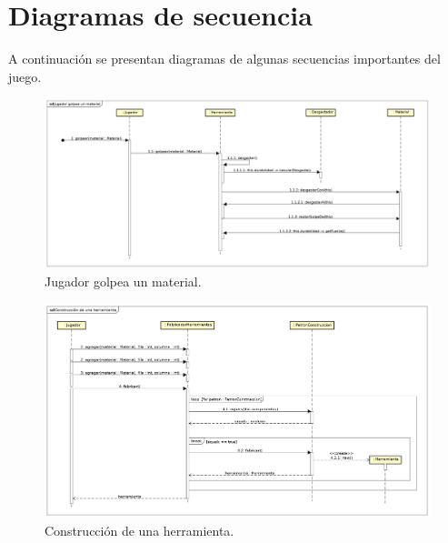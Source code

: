 \documentclass[titlepage,a4paper]{article}
\begin{document}
\section{Diagramas de secuencia}\label{sec:diagramasdesecuencia}
A continuación se presentan diagramas de algunas secuencias importantes del juego.

\begin{figure}[H]
\centering
\includegraphics[width=\textwidth]{Diagramas/JugadorGolpeaMaterial.png}
\caption{\label{fig:jugadorGolpeaMaterial}Jugador golpea un material.}
\end{figure}

\begin{figure}[H]
	\centering
	\includegraphics[width=\textwidth]{Diagramas/ConstruccionHerramienta.png}
	\caption{\label{fig:fabricacion}Construcción de una herramienta.}
\end{figure}
\end{document}
